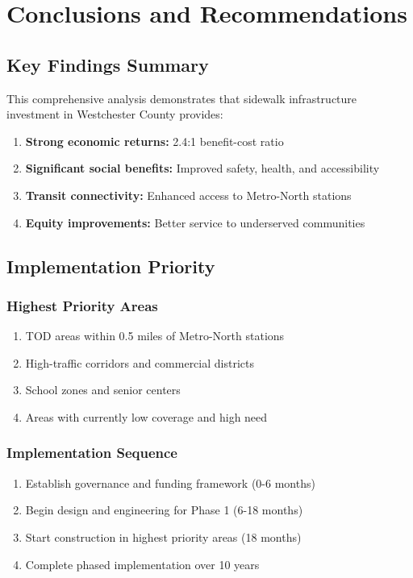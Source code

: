 \documentclass[11pt,letterpaper]{report}
\begin{document}
\chapter{Conclusions and Recommendations}

\section{Key Findings Summary}

This comprehensive analysis demonstrates that sidewalk infrastructure investment in Westchester County provides:

\begin{enumerate}
    \item \textbf{Strong economic returns:} 2.4:1 benefit-cost ratio
    \item \textbf{Significant social benefits:} Improved safety, health, and accessibility
    \item \textbf{Transit connectivity:} Enhanced access to Metro-North stations
    \item \textbf{Equity improvements:} Better service to underserved communities
\end{enumerate}

\section{Implementation Priority}

\subsection{Highest Priority Areas}
\begin{enumerate}
    \item TOD areas within 0.5 miles of Metro-North stations
    \item High-traffic corridors and commercial districts
    \item School zones and senior centers
    \item Areas with currently low coverage and high need
\end{enumerate}

\subsection{Implementation Sequence}
\begin{enumerate}
    \item Establish governance and funding framework (0-6 months)
    \item Begin design and engineering for Phase 1 (6-18 months)
    \item Start construction in highest priority areas (18 months)
    \item Complete phased implementation over 10 years
\end{enumerate}
\end{document}
